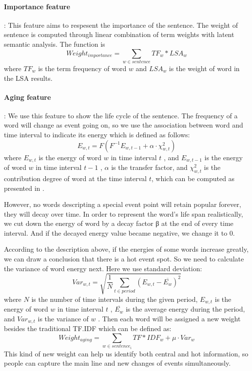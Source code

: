 \documentclass{llncs}
\begin{document}
\paragraph{Importance feature}: This feature aims to respesent the importance of the sentence. The weight of sentence is computed through linear combination of term weights with latent semantic analysis. The function is 
\begin{equation}
Weight_{importance} = \sum_{w \in sentence}TF_w * LSA_w
\end{equation}
where $TF_w$ is the term frequency of word $w$ and $LSA_w$ is the weight of word in the LSA results.

\paragraph{Aging feature}: We use this feature to show the life cycle of the sentence. The frequency of a word will change as event going on, so we use the association between word  and time interval  to indicate its energy which is defined as follows:
\begin{equation}
  E_{w,t} =F(F^{-1}E_{w,t-1}+\alpha\cdot\chi^2_{w,t})
\end{equation}
where $E_{w,t}$ is the energy of word $w$  in time interval $t$ , and $E_{w,t-1}$  is the energy of word $w$ in time interval $t-1$ , $\alpha$ is the transfer factor, and $\chi^2_{w,t}$  is the contribution degree of word  at the time interval $t$, which can be computed as presented in \cite{2000-Swan-p49-56}. 

However, no words descripting a special event point will retain popular forever, they will decay over time. In order to represent the word's life span realistically, we cut down the energy of word by a decay factor β at the end of every time interval. And if the decayed energy value became negative, we change it to 0.

According to the description above, if the energies of some words increase greatly, we can draw a conclusion that there is a hot event spot. So we need to calculate the variance of word energy next. Here we use standard deviation:
\begin{equation}
Var_{w,t} = \sqrt{ \frac{1}{N} \sum_{t \in period}(E_{w,t}- \overline{E_{w}})^2}
\end{equation}
where $N$ is the number of time intervals during the given period, $E_{w,t}$  is the energy of word $w$  in time interval $t$ , $\overline{E_{w}}$  is the average energy during the period, and $Var_{w,t}$  is the variance of $w$ .
Then each word will be assigned a new weight besides the traditional TF.IDF which can be defined as:
 \begin{equation}
Weight_{aging}=\sum_{w \in sentence_i}TF*IDF_{w} + \mu \cdot Var_{w}
\end{equation}
This kind of new weight can help us identify both central and hot information, so people can capture the main line and new changes of events simultaneously.
\end{document}
